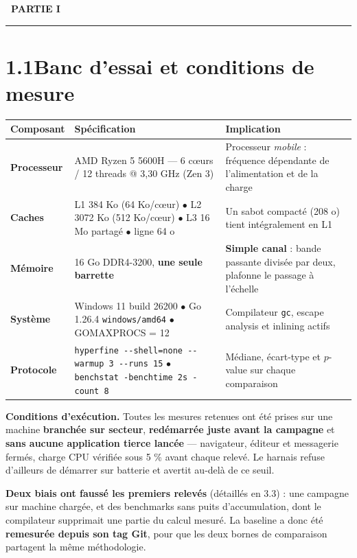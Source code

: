 \documentclass[10pt,a4paper]{article}
\newcommand{\partbanner}[2]{%
  \vspace{2pt}
  \noindent\colorbox{accent}{\color{white}\footnotesize\bfseries\ #1\ }%
  \hspace{6pt}{\color{ink}\bfseries\large #2}\\[-3pt]
  {\color{rulegray}\rule{\textwidth}{0.9pt}}\vspace{-1pt}
}
\newcommand{\code}[1]{\texttt{\small #1}}
\begin{document}
\clearpage

\partbanner{PARTIE I}{Métrologie, protocole \& résultats}

\section{1.1\quad Banc d'essai et conditions de mesure}

\begin{tabularx}{\textwidth}{@{}>{\bfseries\small}p{26mm} >{\small}p{60mm} >{\small\leavevmode\color{muted}}X@{}}
\toprule
\textbf{\small Composant} & \textbf{\small Spécification} & \textbf{\small Implication}\\
\midrule
Processeur & AMD Ryzen 5 5600H — 6 cœurs / 12 threads @ 3,30 GHz (Zen 3) & Processeur \emph{mobile} : fréquence dépendante de l'alimentation et de la charge\\
Caches & L1 384 Ko (64 Ko/cœur) $\bullet$ L2 3072 Ko (512 Ko/cœur) $\bullet$ L3 16 Mo partagé $\bullet$ ligne 64 o & Un sabot compacté (208 o) tient intégralement en L1\\
Mémoire & 16 Go DDR4-3200, \textbf{une seule barrette} & \textbf{Simple canal} : bande passante divisée par deux, plafonne le passage à l'échelle\\
Système & Windows 11 build 26200 $\bullet$ Go 1.26.4 \code{windows/amd64} $\bullet$ GOMAXPROCS = 12 & Compilateur \code{gc}, escape analysis et inlining actifs\\
Protocole & \code{hyperfine -{}-shell=none -{}-warmup 3 -{}-runs 15} $\bullet$ \code{benchstat -benchtime 2s -count 8} & Médiane, écart-type et $p$-value sur chaque comparaison\\
\bottomrule
\end{tabularx}

\vspace{3pt}
\textbf{Conditions d'exécution.} Toutes les mesures retenues ont été prises sur une
machine \textbf{branchée sur secteur}, \textbf{redémarrée juste avant la campagne} et
\textbf{sans aucune application tierce lancée} — navigateur, éditeur et messagerie
fermés, charge CPU vérifiée sous 5 \% avant chaque relevé. Le harnais refuse d'ailleurs
de démarrer sur batterie et avertit au-delà de ce seuil.

\textbf{Deux biais ont faussé les premiers relevés} (détaillés en 3.3) : une campagne sur
machine chargée, et des benchmarks sans puits d'accumulation, dont le compilateur
supprimait une partie du calcul mesuré. La baseline a donc été \textbf{remesurée depuis
son tag Git}, pour que les deux bornes de comparaison partagent la même méthodologie.
\end{document}

